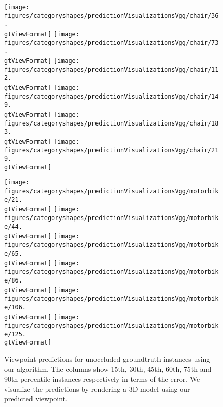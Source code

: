\begin{figure*}[htb!]
\texttt{[image: figures/categoryshapes/predictionVisualizationsVgg/chair/36.\\gtViewFormat]} \hfill
\texttt{[image: figures/categoryshapes/predictionVisualizationsVgg/chair/73.\\gtViewFormat]} \hfill
\texttt{[image: figures/categoryshapes/predictionVisualizationsVgg/chair/112.\\gtViewFormat]}
\texttt{[image: figures/categoryshapes/predictionVisualizationsVgg/chair/149.\\gtViewFormat]} \hfill
\texttt{[image: figures/categoryshapes/predictionVisualizationsVgg/chair/183.\\gtViewFormat]} \hfill
\texttt{[image: figures/categoryshapes/predictionVisualizationsVgg/chair/219.\\gtViewFormat]}

\texttt{[image: figures/categoryshapes/predictionVisualizationsVgg/motorbike/21.\\gtViewFormat]} \hfill
\texttt{[image: figures/categoryshapes/predictionVisualizationsVgg/motorbike/44.\\gtViewFormat]} \hfill
\texttt{[image: figures/categoryshapes/predictionVisualizationsVgg/motorbike/65.\\gtViewFormat]}
\texttt{[image: figures/categoryshapes/predictionVisualizationsVgg/motorbike/86.\\gtViewFormat]} \hfill
\texttt{[image: figures/categoryshapes/predictionVisualizationsVgg/motorbike/106.\\gtViewFormat]} \hfill
\texttt{[image: figures/categoryshapes/predictionVisualizationsVgg/motorbike/125.\\gtViewFormat]}

\caption{Viewpoint predictions for unoccluded groundtruth instances using our algorithm.  The columns show 15th, 30th, 45th, 60th, 75th and 90th percentile instances respectively in terms of the error. We visualize the predictions by rendering a 3D model using our predicted viewpoint.}
\label{figure:viewpointPreds}
\end{figure*}
